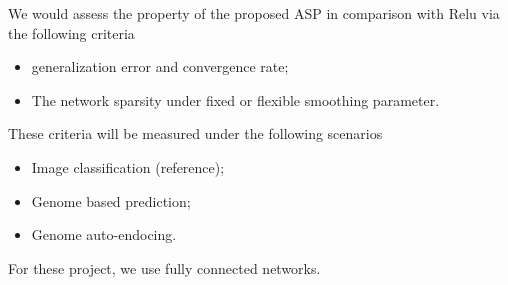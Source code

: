 \documentclass[acmtog, authorversion]{acmart}
\begin{document}
We would assess the property of the proposed ASP in comparison with Relu via the following criteria 
\begin{itemize}
\item generalization error and convergence rate;
\item The network sparsity under fixed or flexible smoothing parameter.
\end{itemize}
These criteria will be measured under the following scenarios
\begin{itemize}
\item Image classification (reference);
\item Genome based prediction;
\item Genome auto-endocing.
\end{itemize}
For these project, we use fully connected networks.



\end{document}
